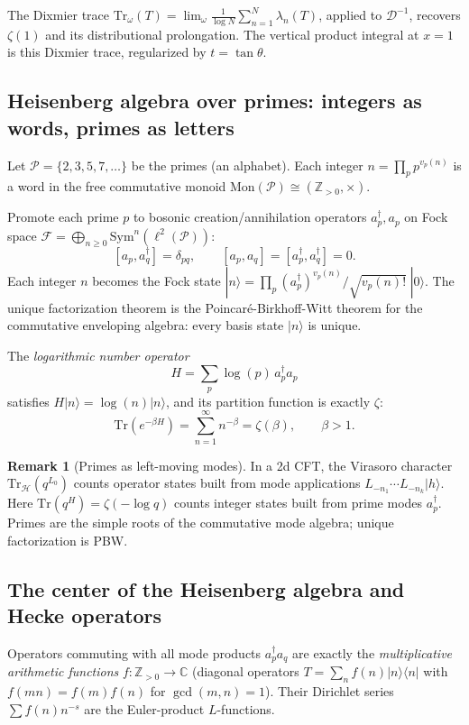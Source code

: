 \documentclass[%
 aip,
 amsmath,amssymb,
 reprint,%
]{revtex4-1}
\theoremstyle{plain}
\theoremstyle{definition}
\newtheorem{remark}[theorem]{Remark}
\newcommand{\C}{\mathbb{C}}
\newcommand{\Z}{\mathbb{Z}}
\begin{document}
The Dixmier trace $\mathrm{Tr}_\omega(T) = \lim_\omega \frac1{\log N}\sum_{n=1}^N \lambda_n(T)$,
applied to $\mathcal{D}^{-1}$, recovers $\zeta(1)$ and its distributional
prolongation. The vertical product integral at $x=1$ is this Dixmier trace,
regularized by $t = \tan\theta$.

\subsection{Heisenberg algebra over primes: integers as words, primes as letters}

Let $\mathcal{P} = \{2,3,5,7,\ldots\}$ be the primes (an alphabet).  Each
integer $n = \prod_p p^{v_p(n)}$ is a word in the free commutative monoid
$\mathrm{Mon}(\mathcal{P}) \cong (\Z_{>0}, \times)$.

Promote each prime $p$ to bosonic creation/annihilation operators
$a_p^\dagger, a_p$ on Fock space $\mathcal{F} = \bigoplus_{n\geq 0} \mathrm{Sym}^n(\ell^2(\mathcal{P}))$:
\[
[a_p, a_q^\dagger] = \delta_{pq}, \qquad
[a_p, a_q] = [a_p^\dagger, a_q^\dagger] = 0.
\]
Each integer $n$ becomes the Fock state
$|n\rangle = \prod_p (a_p^\dagger)^{v_p(n)}/\sqrt{v_p(n)!}\;|0\rangle$.
The unique factorization theorem is the Poincar\'e-Birkhoff-Witt theorem
for the commutative enveloping algebra: every basis state $|n\rangle$ is unique.

The \emph{logarithmic number operator}
\[
H = \sum_p \log(p)\, a_p^\dagger a_p
\]
satisfies $H|n\rangle = \log(n)|n\rangle$, and its partition function is exactly
$\zeta$:
\[
\mathrm{Tr}(e^{-\beta H}) = \sum_{n=1}^\infty n^{-\beta} = \zeta(\beta), \qquad \beta > 1.
\]

\begin{remark}[Primes as left-moving modes]
In a 2d CFT, the Virasoro character $\mathrm{Tr}_\mathcal{H}(q^{L_0})$ counts
operator states built from mode applications $L_{-n_1}\cdots L_{-n_k}|h\rangle$.
Here $\mathrm{Tr}(q^H) = \zeta(-\log q)$ counts integer states built from prime
modes $a_p^\dagger$. Primes are the simple roots of the commutative mode algebra;
unique factorization is PBW.
\end{remark}

\subsection{The center of the Heisenberg algebra and Hecke operators}

Operators commuting with all mode products $a_p^\dagger a_q$ are exactly the
\emph{multiplicative arithmetic functions} $f: \Z_{>0} \to \C$ (diagonal
operators $T = \sum_n f(n)|n\rangle\langle n|$ with $f(mn) = f(m)f(n)$ for
$\gcd(m,n)=1$). Their Dirichlet series $\sum f(n) n^{-s}$ are the Euler-product
$L$-functions.
\end{document}
